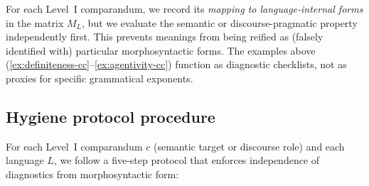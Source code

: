 \documentclass[12pt]{article}
\begin{document}
For each Level~I comparandum, we record its \emph{mapping to language-internal forms} in the matrix $M_L$, but we evaluate the semantic or discourse-pragmatic property independently first. This prevents meanings from being reified as (falsely identified with) particular morphosyntactic forms. The examples above (\ref{ex:definiteness-cc}--\ref{ex:agentivity-cc}) function as diagnostic checklists, not as proxies for specific grammatical exponents.

\subsection{Hygiene protocol procedure}\label{subsec:hygiene-procedure}

For each Level~I comparandum $c$ (semantic target or discourse role) and each language $L$, we follow a five-step protocol that enforces independence of diagnostics from morphosyntactic form:
\end{document}
